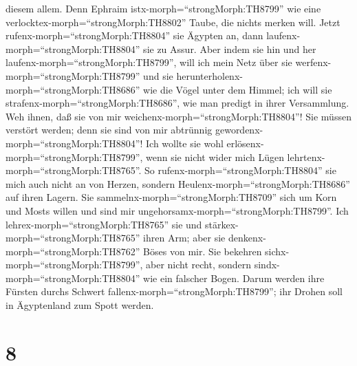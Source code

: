 diesem allem.  Denn Ephraim
istx-morph=``strongMorph:TH8799'' wie eine
verlocktex-morph=``strongMorph:TH8802'' Taube, die nichts merken will.
Jetzt rufenx-morph=``strongMorph:TH8804'' sie Ägypten an, dann
laufenx-morph=``strongMorph:TH8804'' sie zu Assur.  Aber
indem sie hin und her laufenx-morph=``strongMorph:TH8799'', will ich
mein Netz über sie werfenx-morph=``strongMorph:TH8799'' und sie
herunterholenx-morph=``strongMorph:TH8686'' wie die Vögel unter dem
Himmel; ich will sie strafenx-morph=``strongMorph:TH8686'', wie man
predigt in ihrer Versammlung.  Weh ihnen, daß sie von mir
weichenx-morph=``strongMorph:TH8804''! Sie müssen verstört werden; denn
sie sind von mir abtrünnig gewordenx-morph=``strongMorph:TH8804''! Ich
wollte sie wohl erlösenx-morph=``strongMorph:TH8799'', wenn sie nicht
wider mich Lügen lehrtenx-morph=``strongMorph:TH8765''.  So
rufenx-morph=``strongMorph:TH8804'' sie mich auch nicht an von Herzen,
sondern Heulenx-morph=``strongMorph:TH8686'' auf ihren Lagern. Sie
sammelnx-morph=``strongMorph:TH8709'' sich um Korn und Mosts willen und
sind mir ungehorsamx-morph=``strongMorph:TH8799''.  Ich
lehrex-morph=``strongMorph:TH8765'' sie und
stärkex-morph=``strongMorph:TH8765'' ihren Arm; aber sie
denkenx-morph=``strongMorph:TH8762'' Böses von mir.  Sie
bekehren sichx-morph=``strongMorph:TH8799'', aber nicht recht, sondern
sindx-morph=``strongMorph:TH8804'' wie ein falscher Bogen. Darum werden
ihre Fürsten durchs Schwert fallenx-morph=``strongMorph:TH8799''; ihr
Drohen soll in Ägyptenland zum Spott werden.

\hypertarget{section-7}{%
\section{8}\label{section-7}}

